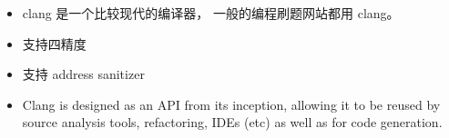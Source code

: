 
\begin{issues}
\issueDraft
\end{issues}

\begin{itemize}
\item clang 是一个比较现代的编译器， 一般的编程刷题网站都用 clang。
\item 支持四精度
\item 支持 address sanitizer
\item Clang is designed as an API from its inception, allowing it to be reused by source analysis tools, refactoring, IDEs (etc) as well as for code generation.
\end{itemize}
